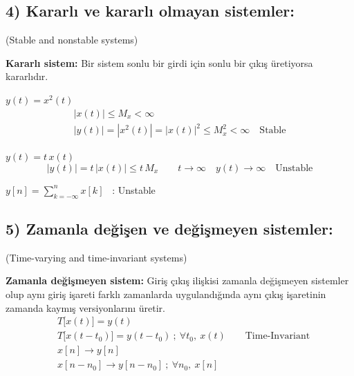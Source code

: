 \documentclass[11pt,a4paper]{article}
\begin{document}
\subsection{4) Kararlı ve kararlı olmayan sistemler:}
(Stable and nonstable systems)

\textbf{Kararlı sistem:} Bir sistem sonlu bir girdi için sonlu bir çıkış üretiyorsa kararlıdır.
\begin{center}
\end{center}

\begin{ornek}[(Ex)]
$y(t) = x^2(t)$
\begin{gather*}
  |x(t)| \leq M_x < \infty \\
  |y(t)| = |x^2(t)| = |x(t)|^2 \leq M_x^2 < \infty \quad \text{Stable}
\end{gather*}
\end{ornek}

\begin{ornek}[(Ex)]
$y(t) = t\,x(t)$
\[ |y(t)| = t\,|x(t)| \leq t\,M_x \qquad t \to \infty \quad y(t) \to \infty \quad \text{Unstable} \]
\end{ornek}

\begin{ornek}[(Ex)]
$y[n] = \displaystyle\sum_{k=-\infty}^{n} x[k]$ \ : Unstable
\end{ornek}

\subsection{5) Zamanla değişen ve değişmeyen sistemler:}
(Time-varying and time-invariant systems)

\textbf{Zamanla değişmeyen sistem:} Giriş çıkış ilişkisi zamanla değişmeyen sistemler olup aynı giriş işareti farklı zamanlarda uygulandığında aynı çıkış işaretinin zamanda kaymış versiyonlarını üretir.
\begin{align*}
  &T\bigl[x(t)\bigr] = y(t) \\
  &T\bigl[x(t-t_0)\bigr] = y(t-t_0)\ ; \ \forall t_0,\ x(t) \qquad \text{Time-Invariant} \\[1mm]
  &x[n] \longrightarrow y[n] \\
  &x[n-n_0] \longrightarrow y[n-n_0]\ ; \ \forall n_0,\ x[n]
\end{align*}
\end{document}
